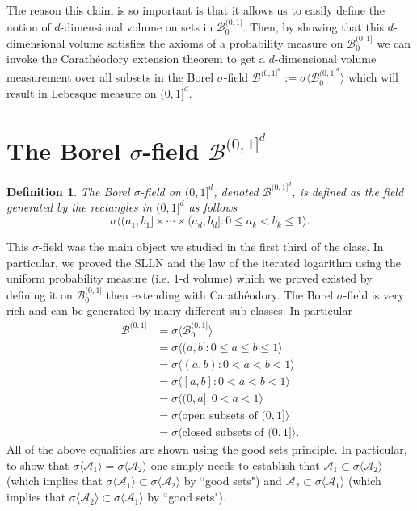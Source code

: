 \documentclass[10pt,letterpaper,twocolumn]{article}
\newtheorem{definition}{Definition}
\begin{document}
The reason this claim is so important is that it allows us to easily define the notion of $d$-dimensional volume  on sets in $\mathcal B_0^{(0,1]}$.  Then, by showing that this $d$-dimensional volume satisfies the axioms of a probability measure on $\mathcal B_0^{(0,1]}$  we can invoke the Carath\'eodory extension theorem to get a $d$-dimensional volume measurement over all subsets in the Borel $\sigma$-field $\mathcal B^{(0,1]^d} :=\sigma \langle \mathcal B_0^{(0,1]^d}\rangle$ which will result in Lebesque measure on $(0,1]^d$.


\section{The Borel $\sigma$-field $\mathcal B^{(0,1]^d}$}

\begin{definition} The Borel $\sigma$-field on $(0,1]^d$, denoted $\mathcal B^{(0,1]^d}$, is defined as the field generated by the rectangles in $(0,1]^d$ as follows
\[
 \sigma\bigl \langle (a_1,b_1]\times\cdots\times (a_d,b_d] : 0\leq a_k < b_k\leq 1 \bigr\rangle.
\]
\end{definition}

This $\sigma$-field was the main object  we studied in the first third of the class. In particular, we proved  the SLLN and the law of the iterated logarithm using the uniform probability measure (i.e.\! $1$-d volume) which we proved existed by defining it on $\mathcal B_0^{(0,1]}$ then extending with Carath\'eodory.
The Borel $\sigma$-field is very rich and can be generated by many different sub-classes. In particular
\begin{align*}
\mathcal B^{(0,1]}
&=\sigma\langle \mathcal B_0^{(0,1]}\rangle \\
&= \sigma\bigl\langle (a,b]: 0\leq a \leq b \leq 1 \bigr\rangle \\
  & =\sigma\bigl\langle (a,b): 0< a < b <1  \bigr\rangle \\
  & =\sigma\bigl\langle [a,b]: 0< a < b <1  \bigr\rangle \\
    & =\sigma\bigl\langle (0,a]: 0< a  <1  \bigr\rangle \\
& = \sigma\bigl\langle \text{open subsets of $(0,1]$}  \bigr\rangle  \\
& = \sigma\bigl\langle \text{closed subsets of $(0,1]$}  \bigr\rangle.
\end{align*}
All of the above equalities are shown using the good sets principle. In particular, to show that $\sigma\langle \mathcal A_1\rangle=\sigma\langle\mathcal A_2 \rangle$ one simply needs to establish that $ \mathcal A_1 \subset \sigma\langle \mathcal A_2\rangle$ (which implies that $ \sigma\langle \mathcal A_1\rangle \subset \sigma\langle \mathcal A_2\rangle$ by ``good sets") and $ \mathcal A_2 \subset \sigma\langle \mathcal A_1\rangle$ (which implies that $ \sigma\langle \mathcal A_2\rangle \subset \sigma\langle \mathcal A_1\rangle$ by ``good sets").
\end{document}
